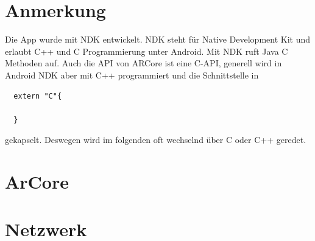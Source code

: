 \section{Anmerkung}
Die App wurde mit NDK entwickelt. NDK steht für Native Development Kit und erlaubt C++ und C Programmierung unter Android.
Mit NDK ruft Java C Methoden auf. Auch die API von ARCore ist eine C-API, generell wird in Android NDK aber mit C++ programmiert und die Schnittstelle in
\begin{verbatim}
  extern "C"{

  }
\end{verbatim}
gekapselt. Deswegen wird im folgenden oft wechselnd über C oder C++ geredet.

\section{ArCore}


\section{Netzwerk}

